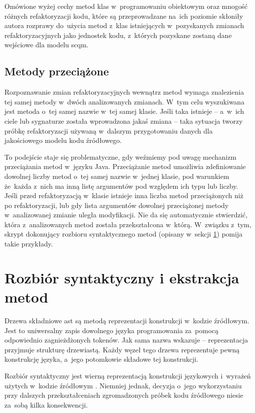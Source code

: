 \documentclass[twoside]{praca}
\begin{document}
Omówione wyżej cechy metod klas w~programowaniu obiektowym oraz mnogość różnych refaktoryzacji kodu, które są przeprowadzane na~ich poziomie skłoniły autora rozprawy do~użycia metod z~klas istniejących w~pozyskanych zmianach refaktoryzacyjnych jako jednostek kodu, z~których pozyskane zostaną dane wejściowe dla modelu \gls{scqm}.

\subsection{Metody przeciążone}
\label{sec:impl:methods-overloaded}

Rozpoznawanie zmian refaktoryzacyjnych wewnątrz metod wymaga znalezienia tej samej metody w~dwóch analizowanych zmianach. W~tym celu wyszukiwana jest metoda o~tej samej nazwie w~tej samej klasie. Jeśli taka istnieje -- a~w~ich ciele lub sygnaturze została wprowadzona jakaś zmiana -- taka sytuacja tworzy próbkę refaktoryzacji używaną w~dalszym przygotowaniu danych dla jakościowego modelu kodu źródłowego.

To podejście staje się problematyczne, gdy weźmiemy pod uwagę mechanizm przeciążania metod w~języku Java. Przeciążanie metod umożliwia zdefiniowanie dowolnej liczby metod o~tej samej nazwie w~jednej klasie, pod warunkiem że~każda z~nich ma inną listę argumentów pod względem ich typu lub liczby. Jeśli przed refaktoryzacją w~klasie istnieje inna liczba metod przeciążonych niż po refaktoryzacji, lub gdy lista argumentów dowolnej przeciążonej metody w~analizowanej zmianie uległa modyfikacji. Nie da się automatycznie stwierdzić, która z~analizowanych metod została przekształcona w~którą. W~związku z~tym, skrypt dokonujący rozbioru syntaktycznego metod (opisany w~sekcji \ref{sec:impl:ast}) pomija takie przykłady.

\section{Rozbiór syntaktyczny i ekstrakcja metod}
\label{sec:impl:ast}
Drzewa składniowe \gls{ast} są metodą reprezentacji konstrukcji w~kodzie źródłowym. Jest to uniwersalny zapis dowolnego języka programowania za~pomocą odpowiednio zagnieżdżonych tokenów. Jak sama nazwa wskazuje -- reprezentacja przyjmuje strukturę drzewiastą. Każdy węzeł tego drzewa reprezentuje pewną konstrukcję języka, a~jego potomkowie składowe tej konstrukcji. 

Rozbiór syntaktyczny jest wierną reprezentacją konstrukcji językowych i~wyrażeń użytych w~kodzie źródłowym \cite{neamtiu2005understanding}. Niemniej jednak, decyzja o~jego wykorzystaniu przy dalszych przekształceniach zgromadzonych próbek kodu źródłowego niesie za~sobą kilka konsekwencji.
\end{document}
